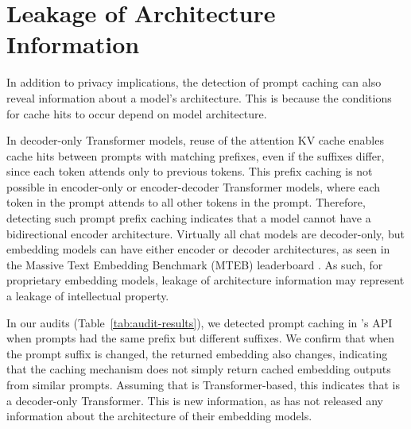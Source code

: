 \section{Leakage of Architecture Information}
\label{sec:architecture-leakage}


In addition to privacy implications, the detection of prompt caching can also reveal information about a model's architecture. This is because the conditions for cache hits to occur depend on model architecture.

In decoder-only Transformer models, reuse of the attention KV cache enables cache hits between prompts with matching prefixes, even if the suffixes differ, since each token attends only to previous tokens. This prefix caching is not possible in encoder-only or encoder-decoder Transformer models, where each token in the prompt attends to all other tokens in the prompt. Therefore, detecting such prompt prefix caching indicates that a model cannot have a bidirectional encoder architecture. Virtually all chat models are decoder-only, but embedding models can have either encoder or decoder architectures, as seen in the Massive Text Embedding Benchmark (MTEB) leaderboard \citep{muennighoff-etal-2023-mteb}. As such, for proprietary embedding models, leakage of architecture information may represent a leakage of intellectual property.

In our audits (Table~\ref{tab:audit-results}), we detected prompt caching in \OpenAI{}'s \OpenAIEmbeddingModel{} API when prompts had the same prefix but different suffixes. We confirm that when the prompt suffix is changed, the returned embedding also changes, indicating that the caching mechanism does not simply return cached embedding outputs from similar prompts. Assuming that \OpenAIEmbeddingModel{} is Transformer-based, this indicates that \OpenAIEmbeddingModel{} is a decoder-only Transformer. This is new information, as \OpenAI{} has not released any information about the architecture of their embedding models.


